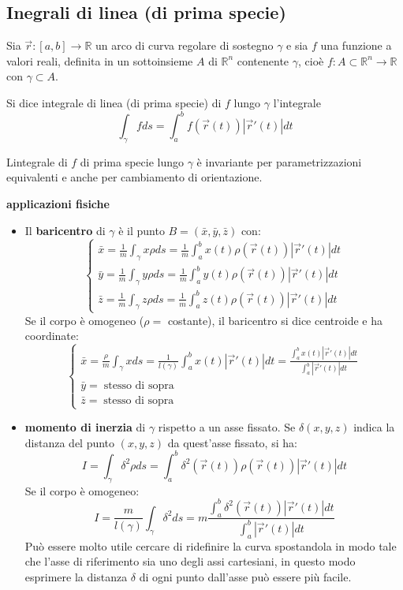 \subsection{Inegrali di linea (di prima specie)}
Sia $\vec{r}: [a,b] \rightarrow \mathbb{R}$ un arco di curva regolare di sostegno $\gamma$ e sia $f$ una funzione a valori reali, definita in un sottoinsieme $A$ di $\mathbb{R}^n$ contenente $\gamma$, cioè $f:A\subset \mathbb{R}^n \rightarrow \mathbb{R}$ con $\gamma \subset A$.
\begin{tcolorbox}
Si dice integrale di linea (di prima specie) di $f$ lungo $\gamma$ l'integrale
\[
    \int_{\gamma} f ds = \int_{a}^{b}f(\vec{r}(t))|\vec{r}'(t)|dt
\]
\end{tcolorbox}
\begin{tcolorbox}
Lintegrale di $f$ di prima specie lungo $\gamma$ è invariante per parametrizzazioni equivalenti e anche per cambiamento di orientazione.
\end{tcolorbox}
\textbf{applicazioni fisiche}
\begin{tcolorbox}
\begin{itemize}
    \item Il \textbf{baricentro} di $\gamma$ è il punto $B = (\bar{x},\bar{y},\bar{z})$ con:
    \[
        \begin{cases}
            \bar{x} = \frac{1}{m}\int_\gamma x\rho ds = \frac{1}{m}\int_{a}^{b}x(t)\rho(\vec{r}(t))|\vec{r}'(t)|dt\\
            \bar{y} = \frac{1}{m}\int_\gamma y\rho ds = \frac{1}{m}\int_{a}^{b}y(t)\rho(\vec{r}(t))|\vec{r}'(t)|dt\\
            \bar{z} = \frac{1}{m}\int_\gamma z\rho ds = \frac{1}{m}\int_{a}^{b}z(t)\rho(\vec{r}(t))|\vec{r}'(t)|dt
        \end{cases}
    \]
    Se il corpo è omogeneo ($\rho =$ costante), il baricentro si dice centroide e ha coordinate:
    \[
        \begin{cases}
            \bar{x} = \frac{\rho}{m}\int_\gamma x ds = \frac{1}{l(\gamma)}\int_{a}^{b}x(t)|\vec{r}'(t)|dt = \frac{\int_{a}^{b}x(t)|\vec{r}'(t)|dt}{\int_{a}^{b}|\vec{r}'(t)|dt}\\
            \bar{y} = \;\text{stesso di sopra}\\   
            \bar{z} = \;\text{stesso di sopra}
        \end{cases}
    \]
    \item \textbf{momento di inerzia} di $\gamma$ rispetto a un asse fissato. Se $\delta(x,y,z)$ indica la distanza del punto $(x,y,z)$ da quest'asse fissato, si ha:
    \[
        I = \int_\gamma \delta^2 \rho ds = \int_{a}^{b}\delta^2(\vec{r}(t))\rho(\vec{r}(t))|\vec{r}'(t)|dt
    \]
    Se il corpo è omogeneo:
    \[
        I = \frac{m}{l(\gamma)}\int_\gamma \delta^2ds = m \frac{\int_{a}^{b}\delta^2(\vec{r}(t))|\vec{r}'(t)|dt}{\int_{a}^{b}|\vec{r}'(t)|dt}
    \]
    Può essere molto utile cercare di ridefinire la curva spostandola in modo tale che l'asse di riferimento sia uno degli assi cartesiani, in questo modo esprimere la distanza $\delta$ di ogni punto dall'asse può essere più facile.
\end{itemize}
\end{tcolorbox}
